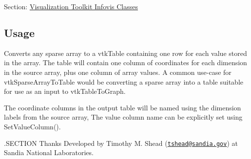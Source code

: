 Section\-: \hyperlink{sec_vtkinfovis}{Visualization Toolkit Infovis Classes} \hypertarget{vtkwidgets_vtkxyplotwidget_Usage}{}\subsection{Usage}\label{vtkwidgets_vtkxyplotwidget_Usage}
Converts any sparse array to a vtk\-Table containing one row for each value stored in the array. The table will contain one column of coordinates for each dimension in the source array, plus one column of array values. A common use-\/case for vtk\-Sparse\-Array\-To\-Table would be converting a sparse array into a table suitable for use as an input to vtk\-Table\-To\-Graph.

The coordinate columns in the output table will be named using the dimension labels from the source array, The value column name can be explicitly set using Set\-Value\-Column().

.S\-E\-C\-T\-I\-O\-N Thanks Developed by Timothy M. Shead (\href{mailto:tshead@sandia.gov}{\tt tshead@sandia.\-gov}) at Sandia National Laboratories.

